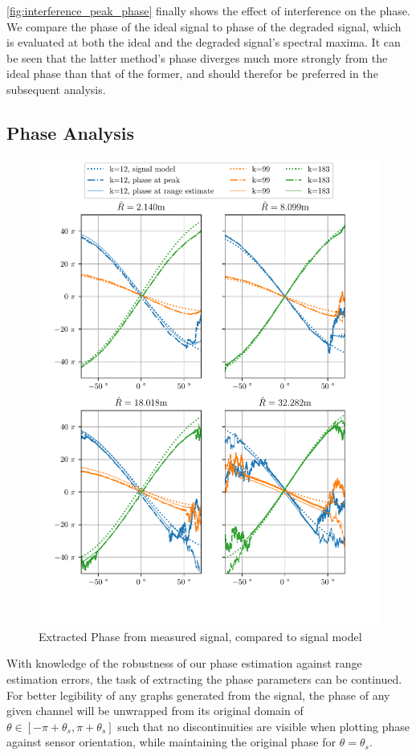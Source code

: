 \autoref{fig:interference_peak_phase} finally shows the effect of interference on the phase.
We compare the phase of the ideal signal to phase of the degraded signal,
which is evaluated at both the ideal and the degraded signal's spectral maxima.
It can be seen that the latter method's phase diverges much more strongly from the ideal phase than that of the former,
and should therefor be preferred in the subsequent analysis. \\

\subsection{Phase Analysis}
\label{sec:phase_analysis}
\begin{figure}
    \centering
    \includegraphics[width=\textwidth]{../figures/phase_estimates.pdf}
    \caption{Extracted Phase from measured signal, compared to signal model}
    \label{fig:measured_peak_phase}
\end{figure}
With knowledge of the robustness of our phase estimation against range estimation errors,
the task of extracting the phase parameters can be continued.
For better legibility of any graphs generated from the signal,
the phase of any given channel will be unwrapped from its original domain of $\theta \in [-\pi+\theta_s, \pi+\theta_s]$ such that no discontinuities
are visible when plotting phase against sensor orientation, while maintaining the original phase for $\theta = \theta_s$.

